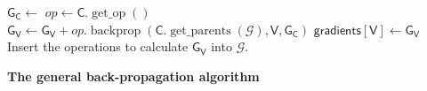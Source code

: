 \documentclass{article}
\begin{document}
\begin{algorithm}[H]
{{            $\mathsf{G}_{\mathsf{C}} \leftarrow$ 
            $op \leftarrow \mathsf{C}.\operatorname{get\_op}()$
            $\mathsf{G}_{\mathsf{V}} \leftarrow \mathsf{G}_{\mathsf{V}} + op.\operatorname{backprop}(
                \mathsf{C}.\operatorname{get\_parents}(\mathcal{G}), \mathsf{V}, \mathsf{G}_{\mathsf{C}}
            )$ \;
        }
        $\mathsf{gradients}[\mathsf{V}] \leftarrow \mathsf{G}_{\mathsf{V}}$
        Insert the operations to calculate $\mathsf{G}_{\mathsf{V}}$ into $\mathcal{G}$. \;
    }
    \BlankLine
    \caption{\textbf{The general back-propagation algorithm}}
\end{algorithm}
\end{document}
